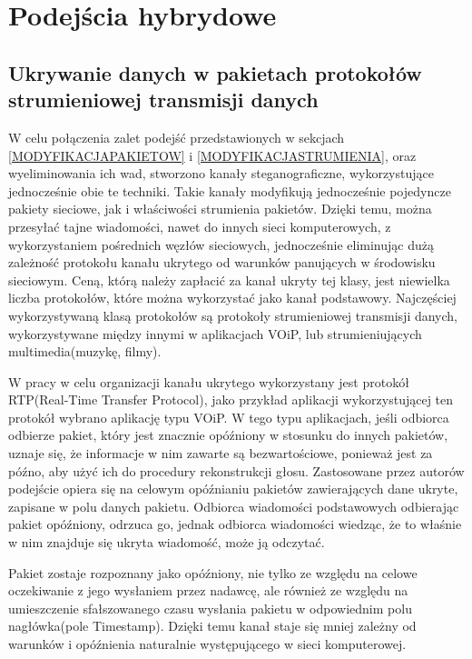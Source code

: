 \documentclass[a4paper, twoside, 12pt]{report}
\begin{document}
    \section{Podejścia hybrydowe}
        \subsection{Ukrywanie danych w pakietach protokołów strumieniowej transmisji danych}
        W celu połączenia zalet podejść przedstawionych w sekcjach
        \ref{MODYFIKACJAPAKIETOW} i \ref{MODYFIKACJASTRUMIENIA}, oraz wyeliminowania
        ich wad, stworzono kanały steganograficzne, wykorzystujące jednocześnie obie te
        techniki. Takie kanały modyfikują jednocześnie pojedyncze pakiety sieciowe,
        jak i właściwości strumienia pakietów. Dzięki temu, można przesyłać tajne wiadomości,
        nawet do innych sieci komputerowych, z wykorzystaniem pośrednich węzłów sieciowych,
        jednocześnie eliminując dużą zależność protokołu kanału ukrytego od warunków
        panujących w środowisku sieciowym. Ceną, którą należy zapłacić za kanał
        ukryty tej klasy, jest niewielka liczba protokołów, które można wykorzystać
        jako kanał podstawowy. Najczęściej wykorzystywaną klasą protokołów są
        protokoły strumieniowej transmisji danych, wykorzystywane między innymi
        w aplikacjach VOiP, lub strumieniujących multimedia(muzykę, filmy).

        W pracy \cite{VOIPSTEGANOGRAPHY} w celu organizacji kanału ukrytego wykorzystany
        jest protokół RTP(Real-Time Transfer Protocol), jako przykład aplikacji
        wykorzystującej ten protokół wybrano aplikację typu VOiP. W tego typu aplikacjach,
        jeśli odbiorca odbierze pakiet, który jest znacznie opóźniony w stosunku
        do innych pakietów, uznaje się, że informacje w nim zawarte są bezwartościowe,
        ponieważ jest za późno, aby użyć ich do procedury rekonstrukcji głosu.
        Zastosowane przez autorów podejście opiera się na celowym opóźnianiu pakietów
        zawierających dane ukryte, zapisane w polu danych pakietu.
        Odbiorca wiadomości podstawowych odbierając pakiet
        opóźniony, odrzuca go, jednak odbiorca wiadomości wiedząc, że to właśnie
        w nim znajduje się ukryta wiadomość, może ją odczytać.

        Pakiet zostaje rozpoznany jako opóźniony, nie tylko ze względu na celowe
        oczekiwanie z jego wysłaniem przez nadawcę, ale również ze względu
        na umieszczenie sfałszowanego czasu wysłania pakietu w odpowiednim
        polu nagłówka(pole Timestamp). Dzięki temu kanał staje się mniej zależny
        od warunków i opóźnienia naturalnie występującego w sieci komputerowej.
\end{document}
